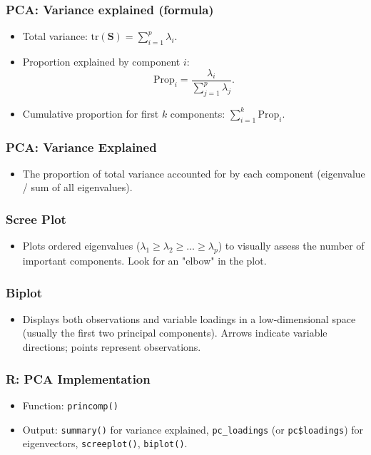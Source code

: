 \documentclass{beamer}
\newcommand{\code}[1]{\texttt{#1}}
\begin{document}
\begin{frame}
    \frametitle{PCA: Variance explained (formula)}
    \begin{itemize}
        \item Total variance: $\mathrm{tr}(\mathbf{S})=\sum_{i=1}^p\lambda_i$.
        \item Proportion explained by component $i$:
        \[\mathrm{Prop}_i=\frac{\lambda_i}{\sum_{j=1}^p\lambda_j}.\]
        \item Cumulative proportion for first $k$ components: $\sum_{i=1}^k\mathrm{Prop}_i$.
    \end{itemize}
\end{frame}

\begin{frame}
    \frametitle{PCA: Variance Explained}
    \begin{itemize}
        \item The proportion of total variance accounted for by each component (eigenvalue / sum of all eigenvalues).
    \end{itemize}
\end{frame}

\begin{frame}
    \frametitle{Scree Plot}
    \begin{itemize}
        \item Plots ordered eigenvalues ($\lambda_1 \ge \lambda_2 \ge \dots \ge \lambda_p$) to visually assess the number of important components. Look for an "elbow" in the plot.
    \end{itemize}
\end{frame}

\begin{frame}
    \frametitle{Biplot}
    \begin{itemize}
        \item Displays both observations and variable loadings in a low-dimensional space (usually the first two principal components). Arrows indicate variable directions; points represent observations.
    \end{itemize}
\end{frame}

\begin{frame}
    \frametitle{R: PCA Implementation}
    \begin{itemize}
        \item Function: \code{princomp()}
        \item Output: \code{summary()} for variance explained, \texttt{pc\_loadings} (or \code{pc\$loadings}) for eigenvectors, \code{screeplot()}, \code{biplot()}.
    \end{itemize}
\end{frame}
\end{document}
